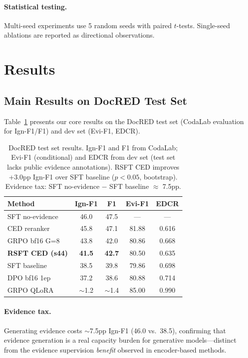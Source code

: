 \documentclass[11pt,a4paper]{article}
\begin{document}
\paragraph{Statistical testing.} Multi-seed experiments use 5 random seeds with paired $t$-tests. Single-seed ablations are reported as directional observations.

\section{Results}
\label{sec:results}

\subsection{Main Results on DocRED Test Set}
\label{sec:main-results}

Table~\ref{tab:main} presents our core results on the DocRED test set (CodaLab evaluation for Ign-F1/F1) and dev set (Evi-F1, EDCR).

\begin{table}[t]
\centering
\small
\begin{tabular}{lcccc}
\toprule
\textbf{Method} & \textbf{Ign-F1} & \textbf{F1} & \textbf{Evi-F1} & \textbf{EDCR} \\
\midrule
SFT no-evidence & 46.0 & 47.5 & --- & --- \\
CED reranker & 45.8 & 47.1 & 81.88 & 0.616 \\
GRPO bf16 G=8 & 43.8 & 42.0 & 80.86 & 0.668 \\
\textbf{RSFT CED (s44)} & \textbf{41.5} & \textbf{42.7} & 80.50 & 0.635 \\
SFT baseline & 38.5 & 39.8 & 79.86 & 0.698 \\
DPO bf16 1ep & 37.2 & 38.6 & 80.88 & 0.714 \\
GRPO QLoRA & $\sim$1.2 & $\sim$1.4 & 85.00 & 0.990 \\
\bottomrule
\end{tabular}
\caption{DocRED test set results. Ign-F1 and F1 from CodaLab; Evi-F1 (conditional) and EDCR from dev set (test set lacks public evidence annotations). RSFT CED improves +3.0pp Ign-F1 over SFT baseline ($p<0.05$, bootstrap). Evidence tax: SFT no-evidence $-$ SFT baseline $\approx$ 7.5pp.}
\label{tab:main}
\end{table}

\paragraph{Evidence tax.} Generating evidence costs $\sim$7.5pp Ign-F1 (46.0 vs.\ 38.5), confirming that evidence generation is a real capacity burden for generative models---distinct from the evidence supervision \emph{benefit} observed in encoder-based methods.
\end{document}
